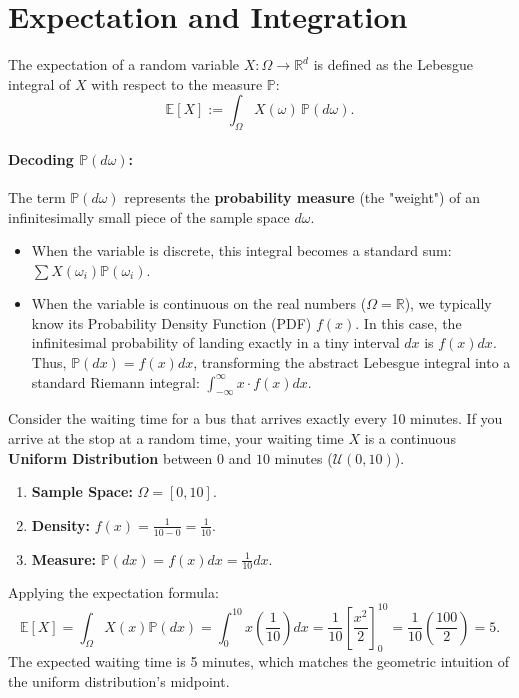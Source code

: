 \section{Expectation and Integration}

\begin{definition}[Expectation]
The expectation of a random variable $X: \Omega \to \mathbb{R}^d$ is defined as the Lebesgue integral of $X$ with respect to the measure $\mathbb{P}$:
\[
\mathbb{E}[X] := \int_{\Omega} X(\omega) \, \mathbb{P}(d\omega).
\]
\end{definition}

\paragraph{Decoding $\mathbb{P}(d\omega)$:}
The term $\mathbb{P}(d\omega)$ represents the \textbf{probability measure} (the "weight") of an infinitesimally small piece of the sample space $d\omega$. 
\begin{itemize}
    \item When the variable is discrete, this integral becomes a standard sum: $\sum X(\omega_i) \mathbb{P}(\omega_i)$.
    \item When the variable is continuous on the real numbers ($\Omega = \mathbb{R}$), we typically know its Probability Density Function (PDF) $f(x)$. In this case, the infinitesimal probability of landing exactly in a tiny interval $dx$ is $f(x)dx$. Thus, $\mathbb{P}(dx) = f(x) dx$, transforming the abstract Lebesgue integral into a standard Riemann integral: $\int_{-\infty}^{\infty} x \cdot f(x) dx$.
\end{itemize}

\begin{example}
Consider the waiting time for a bus that arrives exactly every 10 minutes. If you arrive at the stop at a random time, your waiting time $X$ is a continuous \textbf{Uniform Distribution} between $0$ and $10$ minutes ($\mathcal{U}(0, 10)$).
\begin{enumerate}
    \item \textbf{Sample Space:} $\Omega = [0, 10]$.
    \item \textbf{Density:} $f(x) = \frac{1}{10-0} = \frac{1}{10}$.
    \item \textbf{Measure:} $\mathbb{P}(dx) = f(x)dx = \frac{1}{10}dx$.
\end{enumerate}
Applying the expectation formula:
\[
\mathbb{E}[X] = \int_{\Omega} X(x) \mathbb{P}(dx) = \int_{0}^{10} x \left( \frac{1}{10} \right) dx = \frac{1}{10} \left[ \frac{x^2}{2} \right]_0^{10} = \frac{1}{10}\left( \frac{100}{2} \right) = 5.
\]
The expected waiting time is 5 minutes, which matches the geometric intuition of the uniform distribution's midpoint.
\end{example}

